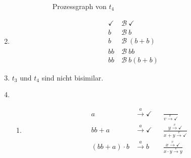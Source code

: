 \documentclass[a4paper]{scrartcl}
\newcommand{\too}{\longrightarrow}
\begin{document}
\begin{enumerate}
\begin{figure}[h]
\begin{subfigure}{0.45\textwidth}
                \caption{Prozessgraph von $t_4$}
                \label{fig:t4}
            \end{subfigure}
            \caption{}
        \end{figure}

    \item
        \begin{equation}
            \begin{split}
                \checkmark \ &\mathcal{B}\  \checkmark \\
                b \ &\mathcal{B}\  b \\
                b \ &\mathcal{B}\  (b + b) \\
                bb \ &\mathcal{B}\  bb \\
                bb \ &\mathcal{B}\  b(b + b)
            \end{split}
        \end{equation}

    \item
        $t_3$ und $t_4$ sind nicht bisimilar.

    \item
        \begin{enumerate}
            \item
                \begin{align}
                        a &\stackrel{a}{\too} \checkmark & &\frac{}{v \stackrel{v}{\too} \checkmark} \\
                        bb + a &\stackrel{a}{\too} \checkmark & &\frac{y \stackrel{v}{\too} \checkmark}{x + y \stackrel{v}{\too} \checkmark} \\
                        (bb + a) \cdot b &\stackrel{a}{\too} b & &\frac{x \stackrel{v}{\too} \checkmark}{x \cdot y \stackrel{v}{\too} y}
                \end{align}


\end{enumerate}
\end{enumerate}
\end{document}
